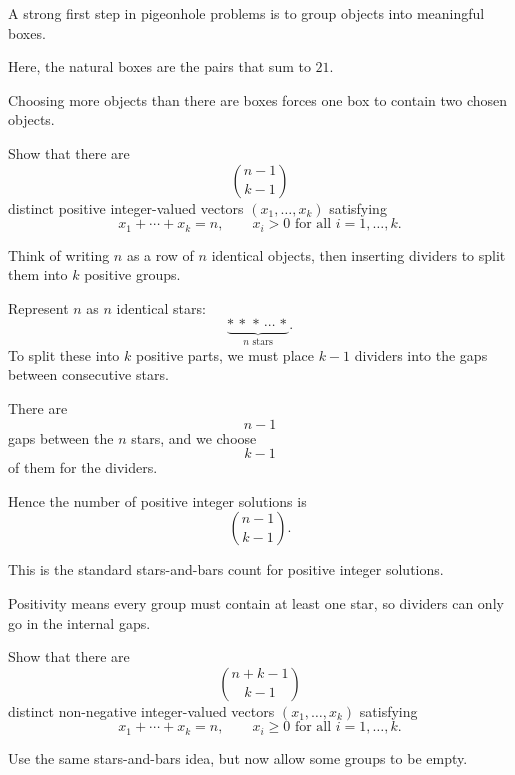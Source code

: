\begin{takeaways}
\item A strong first step in pigeonhole problems is to group objects into meaningful boxes.
\item Here, the natural boxes are the pairs that sum to $21$.
\item Choosing more objects than there are boxes forces one box to contain two chosen objects.
\end{takeaways}

\begin{problem}
Show that there are
\[
\binom{n-1}{k-1}
\]
distinct positive integer-valued vectors $(x_1,\dots,x_k)$ satisfying
\[
x_1+\cdots+x_k=n,
\qquad x_i>0 \text{ for all } i=1,\dots,k.
\]
\end{problem}

\begin{hint}
Think of writing $n$ as a row of $n$ identical objects, then inserting dividers to split them into $k$ positive groups.
\end{hint}

\begin{solution}
Represent $n$ as $n$ identical stars:
\[
\underbrace{*\,*\,*\,\cdots\,*}_{n \text{ stars}}.
\]
To split these into $k$ positive parts, we must place $k-1$ dividers into the gaps between consecutive stars.

There are
\[
n-1
\]
gaps between the $n$ stars, and we choose
\[
k-1
\]
of them for the dividers.

Hence the number of positive integer solutions is
\[
\boxed{\binom{n-1}{k-1}}.
\]
\end{solution}

\begin{takeaways}
\item This is the standard stars-and-bars count for positive integer solutions.
\item Positivity means every group must contain at least one star, so dividers can only go in the internal gaps.
\end{takeaways}

\begin{problem}
Show that there are
\[
\binom{n+k-1}{k-1}
\]
distinct non-negative integer-valued vectors $(x_1,\dots,x_k)$ satisfying
\[
x_1+\cdots+x_k=n,
\qquad x_i\ge 0 \text{ for all } i=1,\dots,k.
\]
\end{problem}

\begin{hint}
Use the same stars-and-bars idea, but now allow some groups to be empty.
\end{hint}


